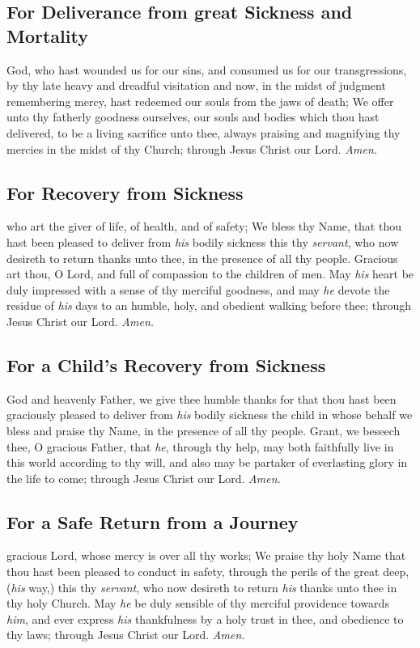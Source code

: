 \subsection{For Deliverance from great Sickness and Mortality}
 God, who hast wounded us for our sins, and consumed us for our transgressions, by thy late heavy and dreadful visitation and now, in the midst of judgment remembering mercy, hast redeemed our souls from the jaws of death; We offer unto thy fatherly goodness ourselves, our souls and bodies which thou hast delivered, to be a living sacrifice unto thee, always praising and magnifying thy mercies in the midst of thy Church; through Jesus Christ our Lord. \textit{Amen.}

\subsection{For Recovery from Sickness}
 who art the giver of life, of health, and of safety; We bless thy Name, that thou hast been pleased to deliver from \textit{his} bodily sickness this thy \textit{servant}, who now desireth to return thanks unto thee, in the presence of all thy people. Gracious art thou, O Lord, and full of compassion to the children of men. May \textit{his} heart be duly impressed with a sense of thy merciful goodness, and may \textit{he} devote the residue of \textit{his} days to an humble, holy, and obedient walking before thee; through Jesus Christ our Lord. \textit{Amen.}

\subsection{For a Child's Recovery from Sickness}
 God and heavenly Father, we give thee humble thanks for that thou hast been graciously pleased to deliver from \textit{his} bodily sickness the child in whose behalf we bless and praise thy Name, in the presence of all thy people. Grant, we beseech thee, O gracious Father, that \textit{he}, through thy help, may both faithfully live in this world according to thy will, and also may be partaker of everlasting glory in the life to come; through Jesus Christ our Lord. \textit{Amen.}

\subsection{For a Safe Return from a Journey}
 gracious Lord, whose mercy is over all thy works; We praise thy holy Name that thou hast been pleased to conduct in safety, through the perils of the great deep, (\textit{his} way,) this thy \textit{servant}, who now desireth to return \textit{his} thanks unto thee in thy holy Church. May \textit{he} be duly sensible of thy merciful providence towards \textit{him}, and ever express \textit{his} thankfulness by a holy trust in thee, and obedience to thy laws; through Jesus Christ our Lord. \textit{Amen.}
